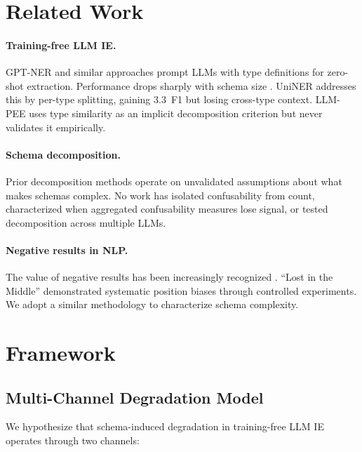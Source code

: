 \documentclass[11pt,a4paper]{article}
\begin{document}
\section{Related Work}
\label{sec:related}

\paragraph{Training-free LLM IE.} GPT-NER \cite{wang2023gptner} and similar approaches prompt LLMs with type definitions for zero-shot extraction. Performance drops sharply with schema size \cite{lu2023chameleon,li2023evaluating}. UniNER \cite{zhou2024universalner} addresses this by per-type splitting, gaining 3.3~F1 but losing cross-type context. LLM-PEE uses type similarity as an implicit decomposition criterion but never validates it empirically.

\paragraph{Schema decomposition.} Prior decomposition methods operate on unvalidated assumptions about what makes schemas complex. No work has isolated confusability from count, characterized when aggregated confusability measures lose signal, or tested decomposition across multiple LLMs.

\paragraph{Negative results in NLP.} The value of negative results has been increasingly recognized \cite{rogers2020primer}. ``Lost in the Middle'' \cite{liu2024lost} demonstrated systematic position biases through controlled experiments. We adopt a similar methodology to characterize schema complexity.

\section{Framework}
\label{sec:framework}

\subsection{Multi-Channel Degradation Model}

We hypothesize that schema-induced degradation in training-free LLM IE operates through two channels:
\end{document}
